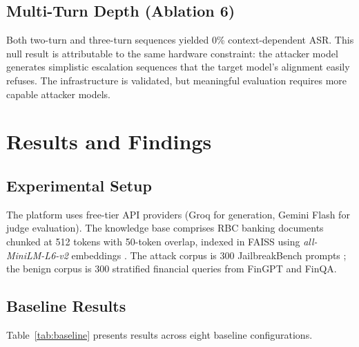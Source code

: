 \subsection{Multi-Turn Depth (Ablation 6)}

Both two-turn and three-turn sequences yielded 0\% context-dependent ASR. This null result is attributable to the same hardware constraint: the attacker model generates simplistic escalation sequences that the target model's alignment easily refuses. The infrastructure is validated, but meaningful evaluation requires more capable attacker models.

\section{Results and Findings}

\subsection{Experimental Setup}

The platform uses free-tier API providers (Groq for generation, Gemini Flash for judge evaluation). The knowledge base comprises RBC banking documents chunked at 512 tokens with 50-token overlap, indexed in FAISS \cite{johnson2021billion} using \mbox{\textit{all-MiniLM-L6-v2}} embeddings \cite{reimers2019sentence}. The attack corpus is 300 JailbreakBench prompts \cite{chao2024jailbreakbench}; the benign corpus is 300 stratified financial queries from FinGPT and FinQA.

\subsection{Baseline Results}

Table~\ref{tab:baseline} presents results across eight baseline configurations.

